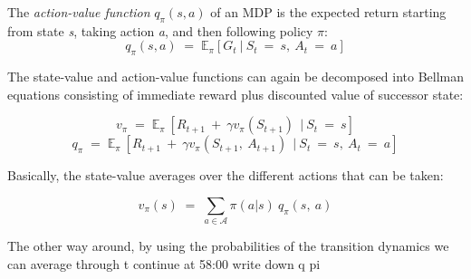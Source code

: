 \documentclass[10pt]{article}
\begin{document}
The \textit{action-value function} $q_{\pi}(s, a)$ of an MDP is the expected return starting from state \textit{s}, taking action \textit{a}, and then following policy $\pi$:
\begin{equation}
q_{\pi}(s,a) \; = \; \mathbb{E}_{\pi} [ G_{t} \: | \: S_{t} \: = \: s, \: A_{t} \: = \: a] 
\end{equation}

The state-value and action-value functions can again be decomposed into Bellman equations consisting of immediate reward plus discounted value of successor state:

\begin{equation}
v_{\pi} \; = \; \mathbb{E}_{\pi} \:[ R_{t+1} \: + \: \gamma v_{\pi} (S_{t+1}) \: \ | \: S_{t} \: = \: s]
\end{equation}
\begin{equation}
q_{\pi} \; = \; \mathbb{E}_{\pi} \:[ R_{t+1} \: + \: \gamma v_{\pi} (S_{t+1}, \: A_{t+1}) \: \ | \: S_{t} \: = \: s, \: A_{t} \: = \: a]
\end{equation}

Basically, the state-value averages over the different actions that can be taken:

\begin{equation}
v_{\pi}(s) \; = \; \sum_{a \in \mathcal{A}} \pi(a|s)\:q_{\pi}(s,\:a)
\end{equation}

The other way around, by using the probabilities of the transition dynamics we can average through t
\newline 
continue at 58:00 write down q pi
\end{document}
